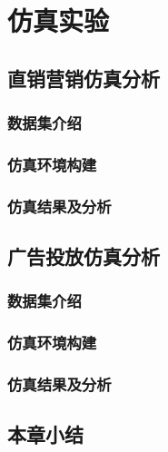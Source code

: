\chapter{仿真实验}

\section{直销营销仿真分析}
\subsection{数据集介绍}
\subsection{仿真环境构建}
\subsection{仿真结果及分析}

\section{广告投放仿真分析}
\subsection{数据集介绍}
\subsection{仿真环境构建}
\subsection{仿真结果及分析}

\section{本章小结}

 